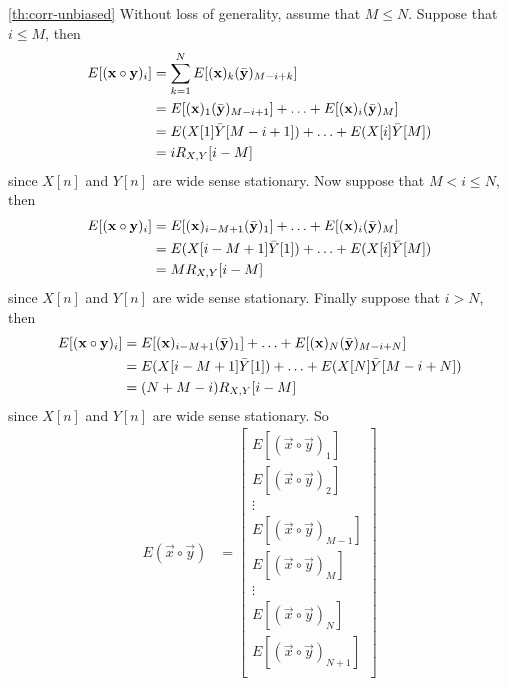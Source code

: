 \documentclass[a4paper, openany, oneside]{memoir}
\begin{document}
\begin{blockProofTheorem}{\ref{th:corr-unbiased}}
    Without loss of generality, assume that $M \le N$. Suppose that $i \le M$, then
    \begin{align*}
        E[(\boldsymbol{\mathbf{x}} \circ \boldsymbol{\mathbf{y}})_i] &= \sum_{k=1}^N E[(\boldsymbol{\mathbf{x}})_k (\bar{\boldsymbol{\mathbf{y}}
        })_{M-i+k}] \\
        &= E[(\boldsymbol{\mathbf{x}})_1 (\bar{\boldsymbol{\mathbf{y}}})_{M-i+1}] + \ldots + E[(\boldsymbol{\mathbf{x}})_i (\bar{\boldsymbol{\mathbf{y}}})_{M}] \\
        &= E(X[1] \bar{Y}[M-i+1]) + \ldots + E(X[i] \bar{Y}[M])  \\
        &= i R_{X,Y}[i-M]
    \end{align*}
    since $X[n]$ and $Y[n]$ are wide sense stationary. Now suppose that $M < i \le N$, then
    \begin{align*}
        E[(\boldsymbol{\mathbf{x}} \circ \boldsymbol{\mathbf{y}})_i] &= E[(\boldsymbol{\mathbf{x}})_{i-M+1} (\bar{\boldsymbol{\mathbf{y}}})_{1}] + \ldots + E[(\boldsymbol{\mathbf{x}})_i (\bar{\boldsymbol{\mathbf{y}}})_{M}] \\
        &= E(X[i-M+1] \bar{Y}[1]) + \ldots + E(X[i] \bar{Y}[M]) \\  
        &= M R_{X,Y}[i-M]
    \end{align*}
    since $X[n]$ and $Y[n]$ are wide sense stationary. Finally suppose that $i > N$, then
    \begin{align*}
        E[(\boldsymbol{\mathbf{x}} \circ \boldsymbol{\mathbf{y}})_i] &= E[(\boldsymbol{\mathbf{x}})_{i-M+1} (\bar{\boldsymbol{\mathbf{y}}})_{1}] + \ldots + E[(\boldsymbol{\mathbf{x}})_N (\bar{\boldsymbol{\mathbf{y}}})_{M-i+N}] \\
        &= E(X[i-M+1] \bar{Y}[1]) + \ldots + E(X[N] \bar{Y}[M-i+N]) \\
        &= (N+M-i) R_{X,Y}[i-M]
    \end{align*}
    since $X[n]$ and $Y[n]$ are wide sense stationary. So
    \begin{align*}
        E(\vec{x} \circ \vec{y}) &= \begin{bmatrix}
            E[(\vec{x} \circ \vec{y})_1] \\
            E[(\vec{x} \circ \vec{y})_2] \\
            \vdots \\
            E[(\vec{x} \circ \vec{y})_{M-1}] \\
            E[(\vec{x} \circ \vec{y})_{M}] \\
            \vdots \\
            E[(\vec{x} \circ \vec{y})_N] \\
            E[(\vec{x} \circ \vec{y})_{N+1}] \\

\end{bmatrix}
\end{align*}
\end{blockProofTheorem}
\end{document}
